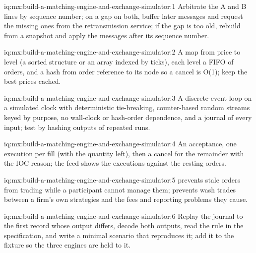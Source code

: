 \begin{solution}{iq:mx:build-a-matching-engine-and-exchange-simulator:1}
Arbitrate the A and B lines by sequence number; on a gap on both, buffer later messages and request the missing ones from the retransmission service; if
the gap is too old, rebuild from a snapshot and apply the messages after its sequence number.
\end{solution}

\begin{solution}{iq:mx:build-a-matching-engine-and-exchange-simulator:2}
A map from price to level (a sorted structure or an array indexed by ticks), each level a FIFO of orders, and a hash from order reference to its node
so a cancel is O(1); keep the best prices cached.
\end{solution}

\begin{solution}{iq:mx:build-a-matching-engine-and-exchange-simulator:3}
A discrete-event loop on a simulated clock with deterministic tie-breaking, counter-based random streams keyed by purpose, no wall-clock or hash-order
dependence, and a journal of every input; test by hashing outputs of repeated runs.
\end{solution}

\begin{solution}{iq:mx:build-a-matching-engine-and-exchange-simulator:4}
An acceptance, one execution per fill (with the quantity left), then a cancel for the remainder with the IOC reason; the feed shows the executions against
the resting orders.
\end{solution}

\begin{solution}{iq:mx:build-a-matching-engine-and-exchange-simulator:5}
 prevents stale orders from trading while a participant cannot manage them;  prevents wash trades between a firm's
own strategies and the fees and reporting problems they cause.
\end{solution}

\begin{solution}{iq:mx:build-a-matching-engine-and-exchange-simulator:6}
Replay the journal to the first record whose output differs, decode both outputs, read the rule in the specification, and write a minimal scenario that
reproduces it; add it to the fixture so the three engines are held to it.
\end{solution}
